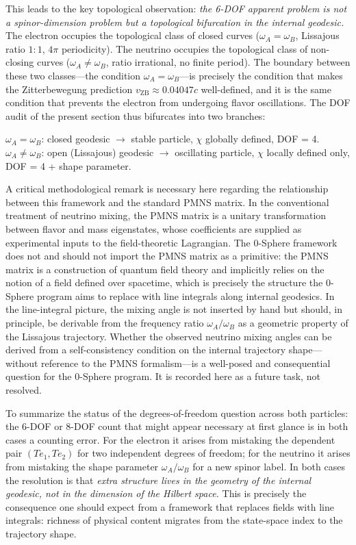 \documentclass[%
 reprint, amsmath,amssymb, aps, prb, ]{revtex4-2}
\numberwithin{equation}{section}
\begin{document}
This leads to the key topological observation: \emph{the 6-DOF apparent problem is not a spinor-dimension problem but a topological bifurcation in the internal geodesic.} The electron occupies the topological class of closed curves ($\omega_A = \omega_B$, Lissajous ratio $1:1$, $4\pi$ periodicity). The neutrino occupies the topological class of non-closing curves ($\omega_A \neq \omega_B$, ratio irrational, no finite period). The boundary between these two classes---the condition $\omega_A = \omega_B$---is precisely the condition that makes the Zitterbewegung prediction $v_\mathrm{ZB} \approx 0.04047c$ well-defined, and it is the same condition that prevents the electron from undergoing flavor oscillations. The DOF audit of the present section thus bifurcates into two branches:

\smallskip
\begin{center}
$\omega_A = \omega_B$: closed geodesic $\longrightarrow$ stable particle, $\chi$ globally defined, DOF = 4.\\[4pt]
$\omega_A \neq \omega_B$: open (Lissajous) geodesic $\longrightarrow$ oscillating particle, $\chi$ locally defined only, DOF = 4 + shape parameter.
\end{center}
\smallskip

\noindent A critical methodological remark is necessary here regarding the relationship between this framework and the standard PMNS matrix. In the conventional treatment of neutrino mixing, the PMNS matrix is a unitary transformation between flavor and mass eigenstates, whose coefficients are supplied as experimental inputs to the field-theoretic Lagrangian. The 0-Sphere framework does not and should not import the PMNS matrix as a primitive: the PMNS matrix is a construction of quantum field theory and implicitly relies on the notion of a field defined over spacetime, which is precisely the structure the 0-Sphere program aims to replace with line integrals along internal geodesics. In the line-integral picture, the mixing angle is not inserted by hand but should, in principle, be derivable from the frequency ratio $\omega_A/\omega_B$ as a geometric property of the Lissajous trajectory. Whether the observed neutrino mixing angles can be derived from a self-consistency condition on the internal trajectory shape---without reference to the PMNS formalism---is a well-posed and consequential question for the 0-Sphere program. It is recorded here as a future task, not resolved.

To summarize the status of the degrees-of-freedom question across both particles: the 6-DOF or 8-DOF count that might appear necessary at first glance is in both cases a counting error. For the electron it arises from mistaking the dependent pair $(Te_1, Te_2)$ for two independent degrees of freedom; for the neutrino it arises from mistaking the shape parameter $\omega_A/\omega_B$ for a new spinor label. In both cases the resolution is that \emph{extra structure lives in the geometry of the internal geodesic, not in the dimension of the Hilbert space.} This is precisely the consequence one should expect from a framework that replaces fields with line integrals: richness of physical content migrates from the state-space index to the trajectory shape.
\end{document}
